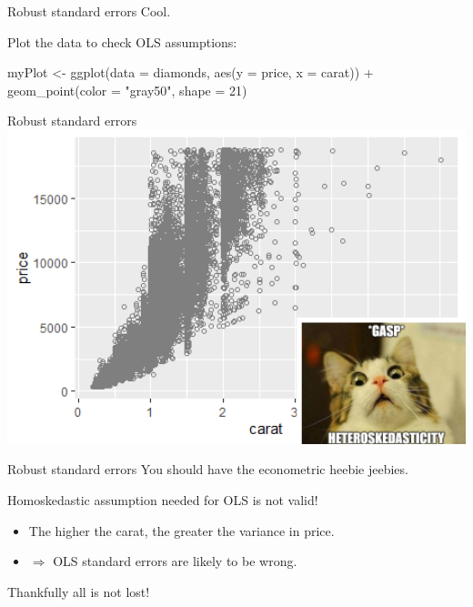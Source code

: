 \documentclass[
  ignorenonframetext,
]{beamer}
\newenvironment{Shaded}{\begin{snugshade}}{\end{snugshade}}
\newcommand{\AttributeTok}[1]{\textcolor[rgb]{0.77,0.63,0.00}{#1}}
\newcommand{\DecValTok}[1]{\textcolor[rgb]{0.00,0.00,0.81}{#1}}
\newcommand{\FunctionTok}[1]{\textcolor[rgb]{0.00,0.00,0.00}{#1}}
\newcommand{\NormalTok}[1]{#1}
\newcommand{\OtherTok}[1]{\textcolor[rgb]{0.56,0.35,0.01}{#1}}
\newcommand{\SpecialCharTok}[1]{\textcolor[rgb]{0.00,0.00,0.00}{#1}}
\newcommand{\StringTok}[1]{\textcolor[rgb]{0.31,0.60,0.02}{#1}}
\begin{document}
\begin{frame}[fragile]{Robust standard errors}
\protect\hypertarget{robust-standard-errors-3}{}
Cool.

Plot the data to check OLS assumptions:

\tiny

\begin{Shaded}
\begin{Highlighting}[]
\NormalTok{myPlot }\OtherTok{\textless{}{-}} \FunctionTok{ggplot}\NormalTok{(}\AttributeTok{data =}\NormalTok{ diamonds, }\FunctionTok{aes}\NormalTok{(}\AttributeTok{y =}\NormalTok{ price, }\AttributeTok{x =}\NormalTok{ carat)) }\SpecialCharTok{+}
\FunctionTok{geom\_point}\NormalTok{(}\AttributeTok{color =} \StringTok{"gray50"}\NormalTok{, }\AttributeTok{shape =} \DecValTok{21}\NormalTok{) }
\end{Highlighting}
\end{Shaded}
\end{frame}

\begin{frame}{Robust standard errors}
\protect\hypertarget{robust-standard-errors-4}{}
\includegraphics[width=6.29in]{img_with_inset}
\end{frame}

\begin{frame}{Robust standard errors}
\protect\hypertarget{robust-standard-errors-5}{}
You should have the econometric heebie jeebies.

Homoskedastic assumption needed for OLS is not valid!

\begin{itemize}
\item
  The higher the carat, the greater the variance in price.
\item
  \(\Rightarrow\) OLS standard errors are likely to be wrong.
\end{itemize}

Thankfully all is not lost!
\end{frame}
\end{document}
